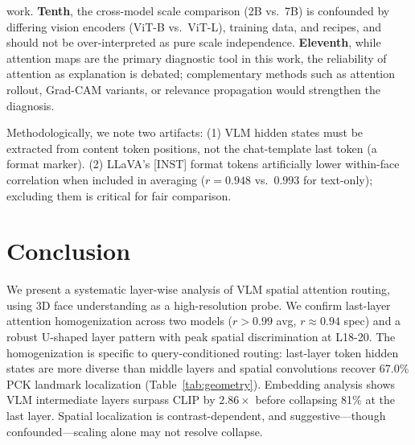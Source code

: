 \documentclass[10pt,twocolumn,letterpaper]{article}
\begin{document}
work. \textbf{Tenth}, the cross-model scale comparison (2B vs.\ 7B) is confounded by differing vision encoders (ViT-B vs.\ ViT-L), training data, and recipes, and should not be over-interpreted as pure scale independence. \textbf{Eleventh}, while attention maps are the primary diagnostic tool in this work, the reliability of attention as explanation is debated; complementary methods such as attention rollout, Grad-CAM variants, or relevance propagation would strengthen the diagnosis.

Methodologically, we note two artifacts: (1) VLM hidden states must be extracted from content token positions, not the chat-template last token (a format marker). (2) LLaVA's [INST] format tokens artificially lower within-face correlation when included in averaging ($r=0.948$ vs.~$0.993$ for text-only); excluding them is critical for fair comparison.

\section{Conclusion}
\label{sec:conc}

We present a systematic layer-wise analysis of VLM spatial attention routing, using 3D face understanding as a high-resolution probe. We confirm last-layer attention homogenization across two models ($r>0.99$ avg, $r\approx0.94$ spec) and a robust U-shaped layer pattern with peak spatial discrimination at L18-20. The homogenization is specific to query-conditioned routing: last-layer token hidden states are more diverse than middle layers and spatial convolutions recover 67.0\% PCK landmark localization (Table~\ref{tab:geometry}). Embedding analysis shows VLM intermediate layers surpass CLIP by $2.86\times$ before collapsing 81\% at the last layer. Spatial localization is contrast-dependent, and suggestive---though confounded---scaling alone may not resolve collapse. 



{\small


}
\end{document}
